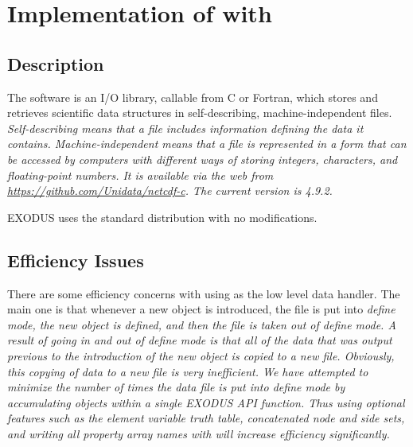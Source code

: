 \chapter{Implementation of \exo{} with }\label{app:efficiency}

\section{Description}

The  software is an I/O library, callable from C or
Fortran, which stores and retrieves scientific data structures in
self-describing, machine-independent files. \em{Self-describing} means
that a file includes information defining the data it
contains. \em{Machine-independent} means that a file is represented in
a form that can be accessed by computers with different ways of
storing integers, characters, and floating-point numbers. It is
available via the web from \url{https://github.com/Unidata/netcdf-c}.  The
current version is 4.9.2.

EXODUS uses the standard  distribution with no modifications.

\section{Efficiency Issues}

There are some efficiency concerns with using  as the low level
data handler. The main one is that whenever a new object is
introduced, the file is put into \em{define} mode, the new object is
defined, and then the file is taken out of \em{define} mode. A result
of going in and out of \em{define} mode is that all of the data that
was output previous to the introduction of the new object is copied to
a new file. Obviously, this copying of data to a new file is very
inefficient. We have attempted to minimize the number of times the
data file is put into \em{define} mode by accumulating objects within
a single EXODUS API function. Thus using optional features such as
the element variable truth table, concatenated node and side sets, and
writing all property array names with  will
increase efficiency significantly.
